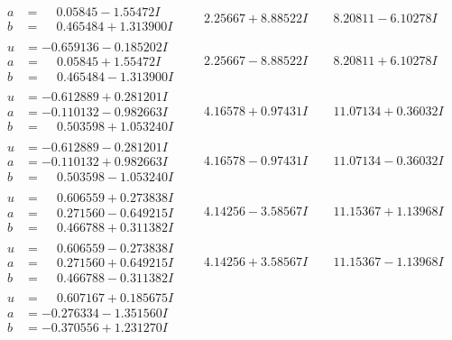 \documentclass[1p]{elsarticle_modified}
\theoremstyle{definition}
\begin{document}
$$\begin{array}{c|c|c}
\begin{aligned}
a &= \phantom{-}0.05845 - 1.55472 I \\
b &= \phantom{-}0.465484 + 1.313900 I\end{aligned}
 & \phantom{-}2.25667 + 8.88522 I & \phantom{-}8.20811 - 6.10278 I \\ \hline\begin{aligned}
u &= -0.659136 - 0.185202 I \\
a &= \phantom{-}0.05845 + 1.55472 I \\
b &= \phantom{-}0.465484 - 1.313900 I\end{aligned}
 & \phantom{-}2.25667 - 8.88522 I & \phantom{-}8.20811 + 6.10278 I \\ \hline\begin{aligned}
u &= -0.612889 + 0.281201 I \\
a &= -0.110132 - 0.982663 I \\
b &= \phantom{-}0.503598 + 1.053240 I\end{aligned}
 & \phantom{-}4.16578 + 0.97431 I & \phantom{-}11.07134 + 0.36032 I \\ \hline\begin{aligned}
u &= -0.612889 - 0.281201 I \\
a &= -0.110132 + 0.982663 I \\
b &= \phantom{-}0.503598 - 1.053240 I\end{aligned}
 & \phantom{-}4.16578 - 0.97431 I & \phantom{-}11.07134 - 0.36032 I \\ \hline\begin{aligned}
u &= \phantom{-}0.606559 + 0.273838 I \\
a &= \phantom{-}0.271560 - 0.649215 I \\
b &= \phantom{-}0.466788 + 0.311382 I\end{aligned}
 & \phantom{-}4.14256 - 3.58567 I & \phantom{-}11.15367 + 1.13968 I \\ \hline\begin{aligned}
u &= \phantom{-}0.606559 - 0.273838 I \\
a &= \phantom{-}0.271560 + 0.649215 I \\
b &= \phantom{-}0.466788 - 0.311382 I\end{aligned}
 & \phantom{-}4.14256 + 3.58567 I & \phantom{-}11.15367 - 1.13968 I \\ \hline\begin{aligned}
u &= \phantom{-}0.607167 + 0.185675 I \\
a &= -0.276334 - 1.351560 I \\
b &= -0.370556 + 1.231270 I\end{aligned}

\end{array}$$
\end{document}
